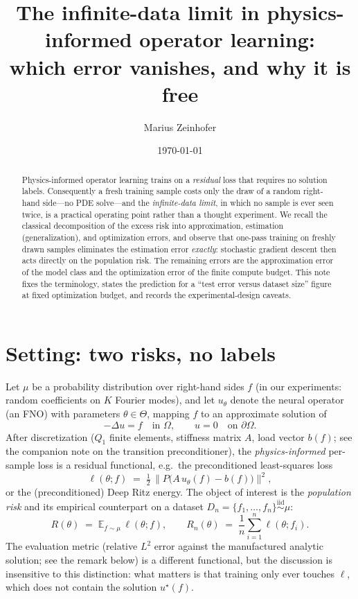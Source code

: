 \documentclass[11pt]{article}
\title{The infinite-data limit in physics-informed operator learning:\\
which error vanishes, and why it is free}
\author{Marius Zeinhofer}
\date{\today}
\newcommand{\Om}{\Omega}
\newcommand{\ustar}{u^\star}
\newcommand{\E}{\mathbb{E}}
\begin{document}
\maketitle

\begin{abstract}
Physics-informed operator learning trains on a \emph{residual} loss that requires no
solution labels. Consequently a fresh training sample costs only the draw of a random
right-hand side---no PDE solve---and the \emph{infinite-data limit}, in which no sample is
ever seen twice, is a practical operating point rather than a thought experiment. We
recall the classical decomposition of the excess risk into approximation, estimation
(generalization), and optimization errors, and observe that one-pass training on freshly
drawn samples eliminates the estimation error \emph{exactly}: stochastic gradient descent
then acts directly on the population risk. The remaining errors are the approximation
error of the model class and the optimization error of the finite compute budget. This
note fixes the terminology, states the prediction for a ``test error versus dataset
size'' figure at fixed optimization budget, and records the experimental-design caveats.
\end{abstract}

\section{Setting: two risks, no labels}

Let $\mu$ be a probability distribution over right-hand sides $f$ (in our experiments:
random coefficients on $K$ Fourier modes), and let $u_\theta$ denote the neural operator
(an FNO) with parameters $\theta\in\Theta$, mapping $f$ to an approximate solution of
\begin{equation}
  -\Delta u = f \quad\text{in }\Om, \qquad u=0 \quad\text{on }\partial\Om .
\end{equation}
After discretization ($Q_1$ finite elements, stiffness matrix $A$, load vector $b(f)$;
see the companion note on the transition preconditioner), the \emph{physics-informed}
per-sample loss is a residual functional, e.g.\ the preconditioned least-squares loss
\begin{equation}
  \ell(\theta; f) \;=\; \tfrac12\,\bigl\| P\bigl(A\,u_\theta(f) - b(f)\bigr) \bigr\|^2 ,
  \label{eq:pls}
\end{equation}
or the (preconditioned) Deep Ritz energy. The object of interest is the
\emph{population risk} and its empirical counterpart on a dataset
$D_n=\{f_1,\dots,f_n\}\overset{\text{iid}}{\sim}\mu$:
\begin{equation}
  R(\theta) \;=\; \E_{f\sim\mu}\,\ell(\theta;f),
  \qquad
  R_n(\theta) \;=\; \frac1n \sum_{i=1}^n \ell(\theta;f_i).
\end{equation}
The evaluation metric (relative $L^2$ error against the manufactured analytic solution;
see the remark below) is a different functional, but the discussion is insensitive to
this distinction: what matters is that training only ever touches $\ell$, which does not
contain the solution $\ustar(f)$.
\end{document}
